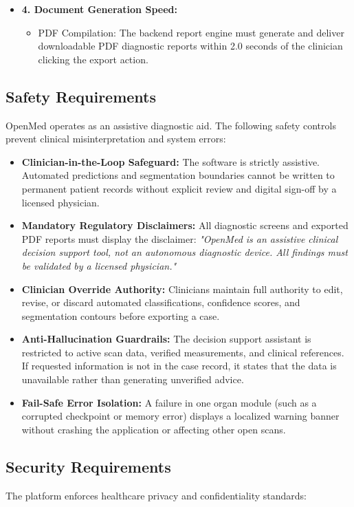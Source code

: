 \documentclass[12pt,a4paper]{report}
\begin{document}
\begin{itemize}[leftmargin=1.2em]
    \item \textbf{4. Document Generation Speed:}
    \begin{itemize}[leftmargin=1.2em]
        \item PDF Compilation: The backend report engine must generate and deliver downloadable PDF diagnostic reports within 2.0 seconds of the clinician clicking the export action.
    \end{itemize}
\end{itemize}
\subsection{Safety Requirements}
OpenMed operates as an assistive diagnostic aid. The following safety controls prevent clinical misinterpretation and system errors:

\begin{itemize}[leftmargin=1.2em]
    \item \textbf{Clinician-in-the-Loop Safeguard:} The software is strictly assistive. Automated predictions and segmentation boundaries cannot be written to permanent patient records without explicit review and digital sign-off by a licensed physician.
    \item \textbf{Mandatory Regulatory Disclaimers:} All diagnostic screens and exported PDF reports must display the disclaimer: \textit{"OpenMed is an assistive clinical decision support tool, not an autonomous diagnostic device. All findings must be validated by a licensed physician."}
    \item \textbf{Clinician Override Authority:} Clinicians maintain full authority to edit, revise, or discard automated classifications, confidence scores, and segmentation contours before exporting a case.
    \item \textbf{Anti-Hallucination Guardrails:} The decision support assistant is restricted to active scan data, verified measurements, and clinical references. If requested information is not in the case record, it states that the data is unavailable rather than generating unverified advice.
    \item \textbf{Fail-Safe Error Isolation:} A failure in one organ module (such as a corrupted checkpoint or memory error) displays a localized warning banner without crashing the application or affecting other open scans.
\end{itemize}

\subsection{Security Requirements}
The platform enforces healthcare privacy and confidentiality standards:
\end{document}

